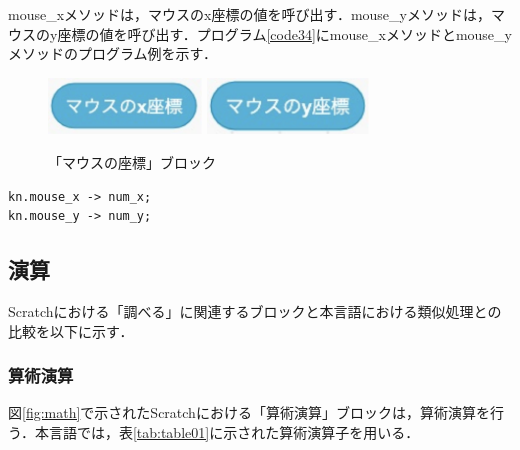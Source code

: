 \documentclass[10pt,a4j]{ltjsarticle}
\begin{document}
mouse\_xメソッドは，マウスのx座標の値を呼び出す．mouse\_yメソッドは，マウスのy座標の値を呼び出す．プログラム\ref{code34}にmouse\_xメソッドとmouse\_yメソッドのプログラム例を示す．

\begin{figure}[H]
  \centering
  \includegraphics[height=15mm]{images/mouse_x.pdf} 
  \includegraphics[height=15mm]{images/mouse_y.pdf} 
  \caption{「マウスの座標」ブロック}
  \label{fig:length}
\end{figure}

\begin{lstlisting}[caption=mouse\_xメソッドとmouse\_yメソッドのプログラム例, label=code34]
kn.mouse_x -> num_x;
kn.mouse_y -> num_y;
\end{lstlisting}

\subsection{演算}
Scratchにおける「調べる」に関連するブロックと本言語における類似処理との比較を以下に示す．
\subsubsection{算術演算}
図\ref{fig:math}で示されたScratchにおける「算術演算」ブロックは，算術演算を行う．本言語では，表\ref{tab:table01}に示された算術演算子を用いる．
\end{document}
